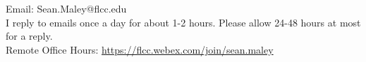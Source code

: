\documentclass[11pt]{article} %
\begin{document}
\begin{center}
	{\small Email: Sean.Maley@flcc.edu\\
		I reply to emails once a day for about 1-2 hours.  Please allow 24-48 hours at most for a reply.  \\
	Remote Office Hours: \textcolor{blue}{\url{https://flcc.webex.com/join/sean.maley}}}
	
\end{center}
\end{document}
